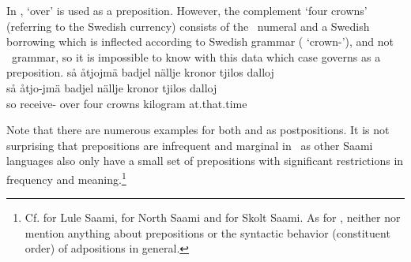 In ,  ‘over’ is used as a preposition. %
However, the complement  ‘four crowns’ (referring to the Swedish currency) consists of the \PS\ numeral  and a Swedish borrowing  which is inflected according to Swedish grammar ( ‘crown-\PLs’), and not \PS\ grammar, so it is impossible to know with this data which case  governs as a preposition. 
\ea\label{prepositionEx2}%
\glll	så åtjojmä badjel nällje kronor tjilos dalloj\\
	så åtjo-jmä badjel nällje kronor tjilos dalloj\\
	so receive- over four crowns kilogram at.that.time\\\nopagebreak
{}	
\z

Note that there are numerous examples for both  and  as postpositions. 
It is not surprising that prepositions are infrequent and marginal in \PS\ as other Saami languages also only have a small set of prepositions with significant restrictions in frequency and meaning.\footnote{Cf. \citet[91-92]{Spiik1989} for Lule Saami, \citet[84-85]{Svonni2009} for North Saami and \citet[314-317]{Feist2010} for Skolt Saami. As for \PS, neither \citet{Lagercrantz1926} nor \citet{Lehtiranta1992} mention anything about prepositions or the syntactic behavior (constituent order) of adpositions in general.} %




